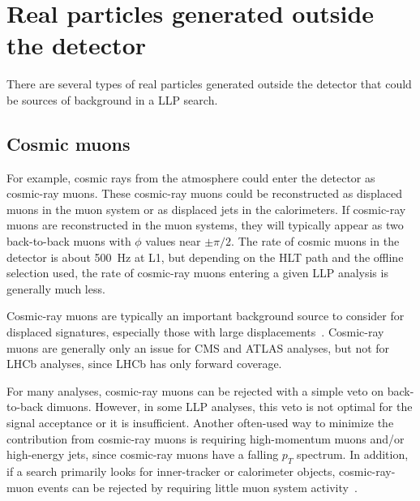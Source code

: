 
\section{Real particles generated outside the detector} %

There are several types of real particles generated outside the detector that could be sources of background in a LLP search.

\subsection{Cosmic muons} %

For example, cosmic rays from the atmosphere could enter the detector as cosmic-ray muons. These cosmic-ray muons could be reconstructed as displaced muons in the muon system or as displaced jets in the calorimeters. If cosmic-ray muons are reconstructed in the muon systems, they will typically appear as two back-to-back muons with $\phi$ values near $\pm\pi/2$. The rate of cosmic muons in the detector is about 500~Hz at L1, but depending on the HLT path and the offline selection used, the rate of cosmic-ray muons entering a given LLP analysis is generally much less.

Cosmic-ray muons are typically an important background source to consider for displaced signatures, especially those with large displacements~\cite{Khachatryan:2015jha, Chatrchyan:2012dxa, Khachatryan:2010uf, Aad:2012zn,Aad:2013gva}. Cosmic-ray muons are generally only an issue for CMS and ATLAS analyses, but not for LHCb analyses, since LHCb has only forward coverage.

For many analyses, cosmic-ray muons can be rejected with a simple veto on back-to-back dimuons. However, in some LLP analyses, this veto is not optimal for the signal acceptance or it is insufficient. Another often-used way to minimize the contribution from cosmic-ray muons is requiring high-momentum muons and/or high-energy jets, since cosmic-ray muons have a falling $p_{T}$ spectrum. In addition, if a search primarily looks for inner-tracker or calorimeter objects, cosmic-ray-muon events can be rejected by requiring little muon system activity~\cite{Khachatryan:2015jha, Chatrchyan:2012dxa, Khachatryan:2010uf}.

